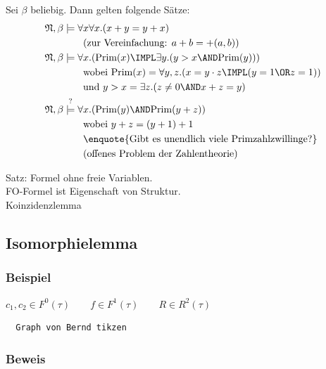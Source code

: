\begin{itemize}
  Sei $\beta$ beliebig. Dann gelten folgende Sätze:
  \begin{align}
    \mathfrak{N}, \beta &\models \forall x \forall x.(x+y=y+x) \\
                        & \qquad\text{(zur Vereinfachung: $a+b = +(a,b)$)} \notag\\
    \mathfrak{N}, \beta &\models \forall x.(\text{Prim}(x) \IMPL \exists y.(y>x \AND \text{Prim}(y))) \\
                        & \qquad\text{wobei $\text{Prim}(x) = \forall y,z.(x=y\cdot z \IMPL (y=1 \OR z=1))$} \notag\\
                        & \qquad\text{und $y>x = \exists z.(z\not=0 \AND x+z = y)$} \notag\\
    \mathfrak{N}, \beta &\stackrel{?}{\models} \forall x.(\text{Prim}(y) \AND \text{Prim}(y+z)) \\
                        & \qquad\text{wobei $y+z = (y+1)+1$} \notag\\
                        & \qquad\text{\enquote{Gibt es unendlich viele Primzahlzwillinge?}}\notag\\
                        & \qquad\text{(offenes Problem der Zahlentheorie)}\notag
  \end{align}
\end{itemize}

Satz: Formel ohne freie Variablen.\\
FO-Formel ist Eigenschaft von Struktur.\\
Koinzidenzlemma\\

\subsection{Isomorphielemma}

\subsubsection{Beispiel}

$c_1, c_2  \in F^0(\tau) \qquad f \in F^1(\tau) \qquad R \in R^2(\tau)$

\begin{verbatim}
  Graph von Bernd tikzen
\end{verbatim}

\subsubsection{Beweis}

